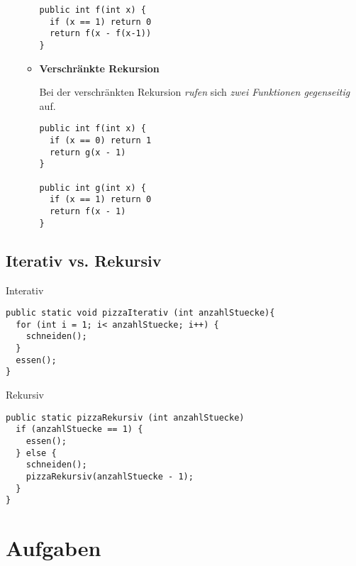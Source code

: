 \documentclass{lehramt-informatik-haupt}
\begin{document}
\begin{itemize}
\begin{itemize}
\begin{verbatim}
public int f(int x) {
  if (x == 1) return 0
  return f(x - f(x-1))
}
\end{verbatim}

%

\item \textbf{Verschränkte Rekursion}

Bei der verschränkten Rekursion \emph{rufen} sich \emph{zwei Funktionen
gegenseitig} auf.

\begin{verbatim}
public int f(int x) {
  if (x == 0) return 1
  return g(x - 1)
}

public int g(int x) {
  if (x == 1) return 0
  return f(x - 1)
}
\end{verbatim}
\end{itemize}
\end{itemize}

%

\section{Iterativ vs. Rekursiv}

\cite[Seite 16-19 (Gedruckte Seitenzahlen stimmen nicht)]{aud:fs:1}

Interativ

\begin{verbatim}
public static void pizzaIterativ (int anzahlStuecke){
  for (int i = 1; i< anzahlStuecke; i++) {
    schneiden();
  }
  essen();
}
\end{verbatim}

Rekursiv

\begin{verbatim}
public static pizzaRekursiv (int anzahlStuecke)
  if (anzahlStuecke == 1) {
    essen();
  } else {
    schneiden();
    pizzaRekursiv(anzahlStuecke - 1);
  }
}
\end{verbatim}


\chapter{Aufgaben}

%

%

\literatur
\end{document}
